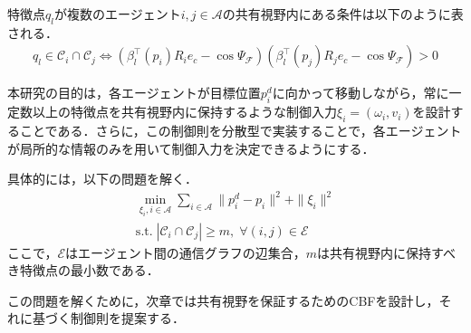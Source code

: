 特徴点$q_l$が複数のエージェント$i, j \in \mathcal{A}$の共有視野内にある条件は以下のように表される．
\begin{equation}
\begin{aligned}
q_l \in \mathcal{C}_i \cap \mathcal{C}_j \iff (\beta_l^{\top}(p_i)R_i e_c - \cos\Psi_\mathcal{F})(\beta_l^{\top}(p_j)R_j e_c - \cos\Psi_\mathcal{F}) > 0
\label{eq:shared_fov_condition}
\end{aligned}
\end{equation}

本研究の目的は，各エージェントが目標位置$p_i^d$に向かって移動しながら，常に一定数以上の特徴点を共有視野内に保持するような制御入力$\xi_i = (\omega_i, v_i)$を設計することである．さらに，この制御則を分散型で実装することで，各エージェントが局所的な情報のみを用いて制御入力を決定できるようにする．

具体的には，以下の問題を解く．
\begin{equation}
\begin{aligned}
\min_{\xi_i, i \in \mathcal{A}} \sum_{i \in \mathcal{A}} \|p_i^d - p_i\|^2 + \|\xi_i\|^2 \\
\text{s.t.} \; |\mathcal{C}_i \cap \mathcal{C}_j| \geq m, \; \forall (i,j) \in \mathcal{E}
\label{eq:problem}
\end{aligned}
\end{equation}
ここで，$\mathcal{E}$はエージェント間の通信グラフの辺集合，$m$は共有視野内に保持すべき特徴点の最小数である．

この問題を解くために，次章では共有視野を保証するためのCBFを設計し，それに基づく制御則を提案する．
